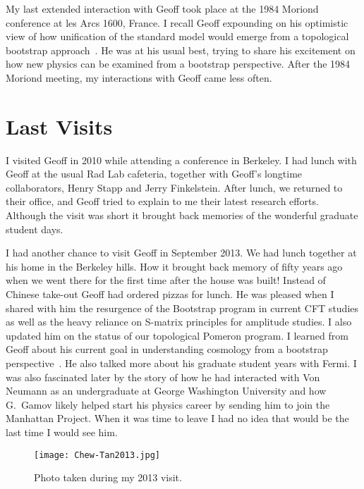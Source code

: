 \documentclass[11pt, oneside]{article}   	%
\newcommand{\<}{\langle}
\renewcommand{\>}{\rangle}
\numberwithin{equation}{section}
\numberwithin{figure}{section}
\begin{document}
My last extended interaction with Geoff took place at the 1984 Moriond conference at les Arcs 1600, France. I recall Geoff expounding on his optimistic view of how unification of the standard model would emerge from a topological bootstrap approach~\cite{Chew:1981hh}. He was at his usual best, trying to share his excitement on how new physics can be examined from a bootstrap  perspective. After the 1984 Moriond meeting, my interactions with Geoff came less often. 

\vspace{1mm}

\section{Last  Visits}
 
I visited  Geoff in 2010 while attending a conference in Berkeley. I had lunch with Geoff at the usual Rad Lab cafeteria, together with Geoff's longtime collaborators, Henry Stapp and Jerry Finkelstein.   After lunch, we returned to their office, and Geoff tried to explain to me their latest research efforts. Although the visit was short it brought back memories of the wonderful graduate student days.


I had another chance to 
visit Geoff  in September 2013. We had lunch together at his home in the Berkeley hills. How it brought back memory of fifty years ago when we went there for the first time after the house was built! Instead of Chinese take-out Geoff had ordered pizzas for lunch. He was pleased when I shared with him the resurgence of the Bootstrap program in current CFT studies as well as the heavy reliance on S-matrix principles for amplitude studies. I also updated him on the status of our topological Pomeron program. I learned from Geoff about his current goal in understanding cosmology from a bootstrap perspective~\cite{Chew:2013qfa}. He also talked more about his graduate student years with Fermi. I was also  fascinated later by the  story of  how he had interacted with Von Neumann as an undergraduate at George Washington University and how G.~Gamov likely helped start his physics career by sending him to join the Manhattan Project. When it was time to leave I had no idea that would be the last time I would see him.


\begin{figure}[h]
\centering
\texttt{[image: Chew-Tan2013.jpg]}
\caption{Photo taken during my 2013 visit.}
\label{fig:chew-tan}
\end{figure}
\end{document}
